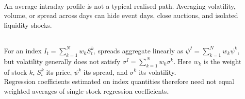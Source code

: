 \documentclass[a4paper,oneside,openany]{book}
\begin{document}
\begin{caveat} \\
An average intraday profile is not a typical realised path. Averaging volatility, volume, or spread across days can hide event days, close auctions, and isolated liquidity shocks.
\end{caveat}

\begin{model} \\
For an index $I_t=\sum_{k=1}^{N}w_kS_t^k$, spreads aggregate linearly as $\psi^I=\sum_{k=1}^{N}w_k\psi^k$, but volatility generally does not satisfy $\sigma^I=\sum_{k=1}^{N}w_k\sigma^k$. Here $w_k$ is the weight of stock $k$, $S_t^k$ its price, $\psi^k$ its spread, and $\sigma^k$ its volatility.\\
Regression coefficients estimated on index quantities therefore need not equal weighted averages of single-stock regression coefficients.
\end{model}
\end{document}
